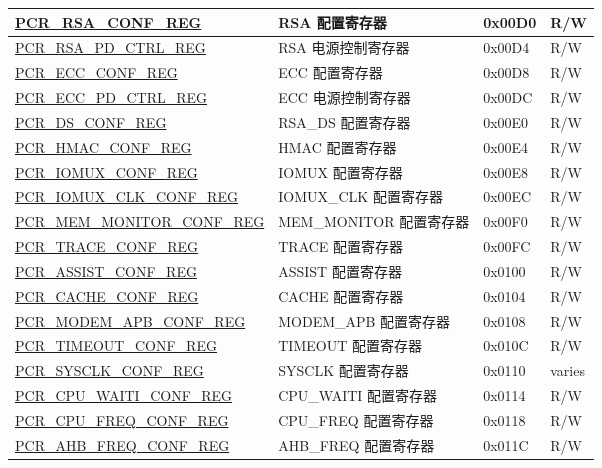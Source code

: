 \begin{longtable}{ | p{6cm} | p{7.2cm} | p{1.3cm} | p{1cm} | }
\hyperref[regdesc:PCRRSACONFREG]{PCR\_RSA\_CONF\_REG} & RSA 配置寄存器 & 0x00D0 & R/W \\ \hline
\hyperref[regdesc:PCRRSAPDCTRLREG]{PCR\_RSA\_PD\_CTRL\_REG} & RSA 电源控制寄存器 & 0x00D4 & R/W \\ \hline
\hyperref[regdesc:PCRECCCONFREG]{PCR\_ECC\_CONF\_REG} & ECC 配置寄存器 & 0x00D8 & R/W \\ \hline
\hyperref[regdesc:PCRECCPDCTRLREG]{PCR\_ECC\_PD\_CTRL\_REG} & ECC 电源控制寄存器 & 0x00DC & R/W \\ \hline
\hyperref[regdesc:PCRDSCONFREG]{PCR\_DS\_CONF\_REG} & RSA\_DS 配置寄存器 & 0x00E0 & R/W \\ \hline
\hyperref[regdesc:PCRHMACCONFREG]{PCR\_HMAC\_CONF\_REG} & HMAC 配置寄存器 & 0x00E4 & R/W \\ \hline
\hyperref[regdesc:PCRIOMUXCONFREG]{PCR\_IOMUX\_CONF\_REG} & IOMUX 配置寄存器 & 0x00E8 & R/W \\ \hline
\hyperref[regdesc:PCRIOMUXCLKCONFREG]{PCR\_IOMUX\_CLK\_CONF\_REG} & IOMUX\_CLK 配置寄存器 & 0x00EC & R/W \\ \hline
\hyperref[regdesc:PCRMEMMONITORCONFREG]{PCR\_MEM\_MONITOR\_CONF\_REG} & MEM\_MONITOR 配置寄存器 & 0x00F0 & R/W \\ \hline
\hyperref[regdesc:PCRTRACECONFREG]{PCR\_TRACE\_CONF\_REG} & TRACE 配置寄存器 & 0x00FC & R/W \\ \hline
\hyperref[regdesc:PCRASSISTCONFREG]{PCR\_ASSIST\_CONF\_REG} & ASSIST 配置寄存器 & 0x0100 & R/W \\ \hline
\hyperref[regdesc:PCRCACHECONFREG]{PCR\_CACHE\_CONF\_REG} & CACHE 配置寄存器 & 0x0104 & R/W \\ \hline
\hyperref[regdesc:PCRMODEMAPBCONFREG]{PCR\_MODEM\_APB\_CONF\_REG} & MODEM\_APB 配置寄存器 & 0x0108 & R/W \\ \hline
\hyperref[regdesc:PCRTIMEOUTCONFREG]{PCR\_TIMEOUT\_CONF\_REG} & TIMEOUT 配置寄存器 & 0x010C & R/W \\ \hline
\hyperref[regdesc:PCRSYSCLKCONFREG]{PCR\_SYSCLK\_CONF\_REG} & SYSCLK 配置寄存器 & 0x0110 & varies \\ \hline
\hyperref[regdesc:PCRCPUWAITICONFREG]{PCR\_CPU\_WAITI\_CONF\_REG} & CPU\_WAITI 配置寄存器 & 0x0114 & R/W \\ \hline
\hyperref[regdesc:PCRCPUFREQCONFREG]{PCR\_CPU\_FREQ\_CONF\_REG} & CPU\_FREQ 配置寄存器 & 0x0118 & R/W \\ \hline
\hyperref[regdesc:PCRAHBFREQCONFREG]{PCR\_AHB\_FREQ\_CONF\_REG} & AHB\_FREQ 配置寄存器 & 0x011C & R/W \\ \hline

\end{longtable}

